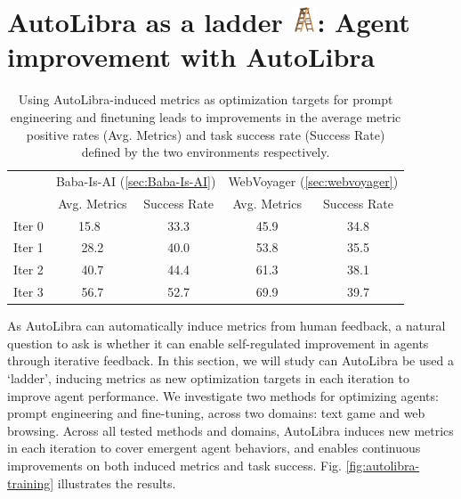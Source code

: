 \section{AutoLibra as a ladder \protect\includegraphics[height=1em]{figs/ladder.png}: Agent improvement with AutoLibra}
\label{sec:ladder}

\begin{table}[!h]
\centering
    \begin{tabular}{rcccc}
    \toprule
         & \multicolumn{2}{c}{Baba-Is-AI (\ref{sec:Baba-Is-AI})}  & \multicolumn{2}{c}{WebVoyager (\ref{sec:webvoyager})} \\ 
        & Avg. Metrics & Success Rate & Avg. Metrics & Success Rate\\ \midrule
        Iter 0 & 15.8\ & 33.3  & 45.9 & 34.8 \\
        Iter 1 & 28.2 & 40.0 & 53.8 & 35.5\\
        Iter 2 & 40.7 & 44.4 & 61.3 & 38.1\\
        Iter 3 & 56.7 & 52.7  & 69.9 & 39.7\\\bottomrule
    \end{tabular}
    \caption{Using AutoLibra-induced metrics as optimization targets for prompt engineering and finetuning leads to improvements in the average metric positive rates (Avg. Metrics) and task success rate (Success Rate) defined by the two environments respectively.}
\label{tab:baba_wv_scores}
\end{table}
As AutoLibra can automatically induce metrics from human feedback, a natural question to ask is whether it can enable self-regulated improvement in agents through iterative feedback. 
In this section, we will study can AutoLibra be used a `ladder', inducing metrics as new optimization targets in each iteration to improve agent performance. We investigate two methods for optimizing agents:
prompt engineering and fine-tuning, across two domains: text game and web browsing. Across all tested methods and domains, AutoLibra induces new metrics in each iteration to cover emergent agent behaviors, and enables continuous improvements on both induced metrics and task success.
Fig. \ref{fig:autolibra-training} illustrates the results. 

